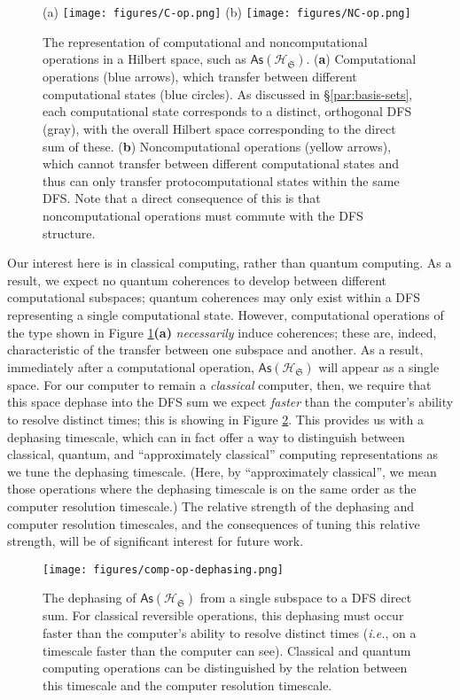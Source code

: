 \documentclass[preprints,article,accept,moreauthors,pdftex]{Definitions/mdpi}
\begin{document}
\begin{paracol}{2}
\begin{figure}[h]
    \centerline{(a) \texttt{[image: figures/C-op.png]}
    \hspace{1 cm}(b) \texttt{[image: figures/NC-op.png]}}
    \caption{The representation of computational and noncomputational operations in a Hilbert space, such as $\mathsf{As}\left(\mathcal{H}_{\mathfrak{S}}\right)$. (\textbf{a}) Computational operations (blue arrows), which transfer between different computational states (blue circles). As discussed in \S\ref{par:basis-sets}, each computational state corresponds to a distinct, orthogonal DFS (gray), with the overall Hilbert space corresponding to the direct sum of these. (\textbf{b}) Noncomputational operations (yellow arrows), which cannot transfer between different computational states and thus can only transfer protocomputational states within the same DFS. Note that a direct consequence of this is that noncomputational operations must commute with the DFS structure.
    \label{fig:c-vs-nc-vN}}
\end{figure}

Our interest here is in classical computing, rather than quantum computing. As a result, we expect no quantum coherences to develop between different computational subspaces; quantum coherences may only exist within a DFS representing a single computational state. However, computational operations of the type shown in Figure \ref{fig:c-vs-nc-vN}\textbf{(a)} \emph{necessarily} induce coherences; these are, indeed, characteristic of the transfer between one subspace and another. As a result, immediately after a computational operation, $\mathsf{As}\left(\mathcal{H}_{\mathfrak{S}}\right)$ will appear as a single space. For our computer to remain a \emph{classical} computer, then, we require that this space dephase into the DFS sum we expect \emph{faster} than the computer's ability to resolve distinct times; this is showing in Figure \ref{fig:dephasing}. This provides us with a dephasing timescale, which can in fact offer a way to distinguish between classical, quantum, and ``approximately classical'' computing representations as we tune the dephasing timescale. (Here, by ``approximately classical'', we mean those operations where the dephasing timescale is on the same order as the computer resolution timescale.) The relative strength of the dephasing and computer resolution timescales, and the consequences of tuning this relative strength, will be of significant interest for future work.

\begin{figure}[h] 
    \centerline{\texttt{[image: figures/comp-op-dephasing.png]}}
    \caption{The dephasing of $\mathsf{As}\left(\mathcal{H}_{\mathfrak{S}}\right)$ from a single subspace to a DFS direct sum. For classical reversible operations, this dephasing must occur faster than the computer's ability to resolve distinct times (\emph{i.e.}, on a timescale faster than the computer can see). Classical and quantum computing operations can be distinguished by the relation between this timescale and the computer resolution timescale. \label{fig:dephasing}}
\end{figure}


\end{paracol}
\end{document}
